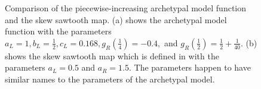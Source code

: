 \begin{figure}
	\centering
	\caption[Comparison of the piecewise-increasing archetypal model function and the skew sawtooth map]{
		Comparison of the piecewise-increasing archetypal model function and the skew sawtooth map.
		(a) shows the archetypal model function with the parameters $a_L = 1, b_L = \frac{1}{2}, c_L = 0.168, g_R\left(\frac{1}{4}\right) = -0.4 ,$ and $g_R\left(\frac{1}{2}\right) = \frac{1}{2} + \frac{1}{40}$.
		(b) shows the skew sawtooth map which is defined in \cite{simpson2018saw} with the parameters $a_L = 0.5$ and $a_R = 1.5$.
		The parameters happen to have similar names to the parameters of the archetypal model.
	}
	\label{fig:add.saw.vs.arch}
\end{figure}

